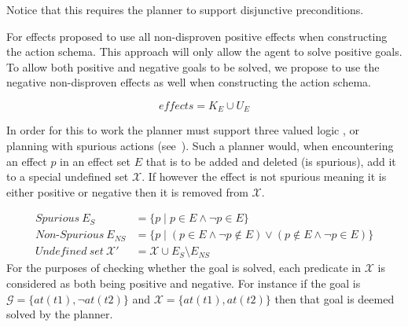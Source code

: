 \documentclass[../Master.tex]{subfiles}
\begin{document}
	Notice that this requires the planner to support disjunctive preconditions.

	For effects \cite{Walsh2008} proposed to use all non-disproven positive effects when constructing the action schema. 
	This approach will only allow the agent to solve positive goals.
	To allow both positive and negative goals to be solved, we propose to use the negative non-disproven effects as well when constructing the action schema.

	\begin{equation}
		effects =  K_E \cup U_E
	\end{equation}

    In order for this to work the planner must support three valued logic \cite{putnam1957a}, or planning with spurious actions (see~\cite{Russell}).
	Such a planner would, when encountering an effect $p$ in an effect set $E$ that is to be added and deleted (is spurious), add it to a special undefined set $\mathcal{X}$.
	If however the effect is not spurious meaning it is either positive or negative then it is removed from $\mathcal{X}$.

			\begin{equation}
				\begin{split}
					Spurious~E_S &= \{ p \mid p \in E \land \neg p \in E \} \\
					Non\text{-}Spurious~E_{NS} &= \{ p \mid (p \in E \land \neg p \notin E ) \lor (p \notin E \land \neg p \in E )  \}\\
					Undefined~set~\mathcal{X}' &= \mathcal{X} \cup E_S \setminus E_{NS}
				\end{split}
			\end{equation}
	For the purposes of checking whether the goal is solved, each predicate in $\mathcal{X}$ is considered as both being positive and negative.
	For instance if the goal is $\mathcal{G} = \{at(t1), \neg at(t2)\}$ and $\mathcal{X} = \{at(t1), at(t2)\}$ then that goal is deemed solved by the planner.
\end{document}
